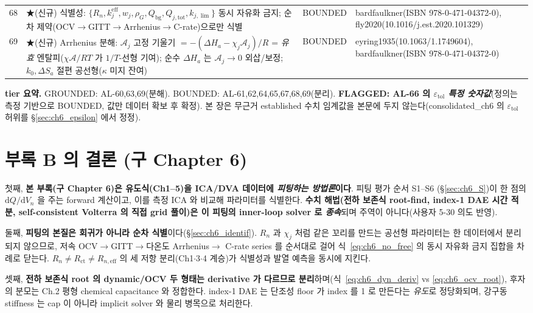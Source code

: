 \documentclass[11pt,a4paper]{article}
\newcommand{\dd}{\mathrm{d}}
\newcommand{\eff}{\mathrm{eff}}
\newcommand{\bg}{\mathrm{bg}}
\newcommand{\tot}{\mathrm{tot}}
\newcommand{\ct}{\mathrm{ct}}
\newcommand{\tol}{\mathrm{tol}}
\newcommand{\brk}{\discretionary{}{}{}}%
\begin{document}
{\begin{longtable}{p{} p{} p{} p{}}
68 & ★(신규) 식별성: $\{R_n,k_j^{\eff},w_j,\rho_G,Q_\bg,Q_{j,\tot},k_{j,\lim}\}$ 동시 자유화 금지; 순차 제약(OCV$\to$GITT$\to$Arrhenius$\to$C-rate)으로만 식별 & BOUNDED & bardfaulkner(ISBN 978-0-\brk 471-04372-0), fly2020(10.1016/\brk j.est.2020.101329) \\
69 & ★(신규) Arrhenius 분해: $\mathcal A_j$ 고정 기울기 $=-(\Delta H_a-\chi_j\mathcal A_j)/R$ = \emph{유효} 엔탈피($\chi\mathcal A/RT$ 가 $1/T$-선형 기여); 순수 $\Delta H_a$ 는 $\mathcal A_j\to0$ 외삽/보정; $k_0,\Delta S_a$ 절편 공선형($\kappa$ 미지 잔여) & BOUNDED & eyring1935(10.1063/\brk 1.1749604), bardfaulkner(ISBN 978-0-\brk 471-04372-0) \\
\bottomrule
\end{longtable}
}
\textbf{tier 요약.} GROUNDED: AL-60,63,69(분해). BOUNDED: AL-61,62,64,65,67,68,69(분리). \textbf{FLAGGED: AL-66 의
$\varepsilon_\tol$ \emph{특정 숫자값}}(정의는 측정 기반으로 BOUNDED, 값만 데이터 확보 후 확정). 본 장은 무근거
established 수치 임계값을 본문에 두지 않는다(consolidated\_ch6 의 $\varepsilon_\tol$ 허위를 \S\ref{sec:ch6_epsilon}
에서 정정).

\section{부록 B 의 결론 (구 Chapter 6)}\label{sec:ch6_concl}
첫째, \textbf{본 부록(구 Chapter 6)은 유도식(Ch1--5)을 ICA/DVA 데이터에 \emph{피팅하는 방법론}이다}. 피팅 평가 순서 S1--S6
(\S\ref{sec:ch6_S})이 한 점의 $\dd Q/\dd V_n$ 을 주는 forward 계산이고, 이를 측정 ICA 와 비교해 파라미터를
식별한다. \textbf{수치 해법(전하 보존식 root-find, index-1 DAE 시간 적분, self-consistent Volterra 의 직접 grid
풀이)은 이 피팅의 inner-loop solver 로 \emph{종속}}되며 주역이 아니다(사용자 5-30 의도 반영).

둘째, \textbf{피팅의 본질은 회귀가 아니라 순차 식별}이다(\S\ref{sec:ch6_identif}). $R_n$ 과 $\chi_j$ 처럼 같은
꼬리를 만드는 공선형 파라미터는 한 데이터에서 분리되지 않으므로, 저속 OCV$\to$GITT$\to$다온도 Arrhenius$\to$
C-rate series 를 순서대로 걸어 식~\eqref{eq:ch6_no_free} 의 동시 자유화 금지 집합을 차례로 닫는다. $R_n\ne R_\ct
\ne R_{n,\eff}$ 의 세 저항 분리(Ch1$\cdot$3$\cdot$4 계승)가 식별성과 발열 예측을 동시에 지킨다.

셋째, \textbf{전하 보존식 root 의 dynamic/OCV 두 형태는 derivative 가 다르므로 분리}하며(식~\eqref{eq:ch6_dyn_deriv}
vs \eqref{eq:ch6_ocv_root}), 후자의 분모는 Ch.2 평형 chemical capacitance 와 정합한다. index-1 DAE 는 단조성
floor 가 index 를 1 로 만든다는 \emph{유도}로 정당화되며, 강구동 stiffness 는 cap 이 아니라 implicit solver 와
물리 병목으로 처리한다.
\end{document}
